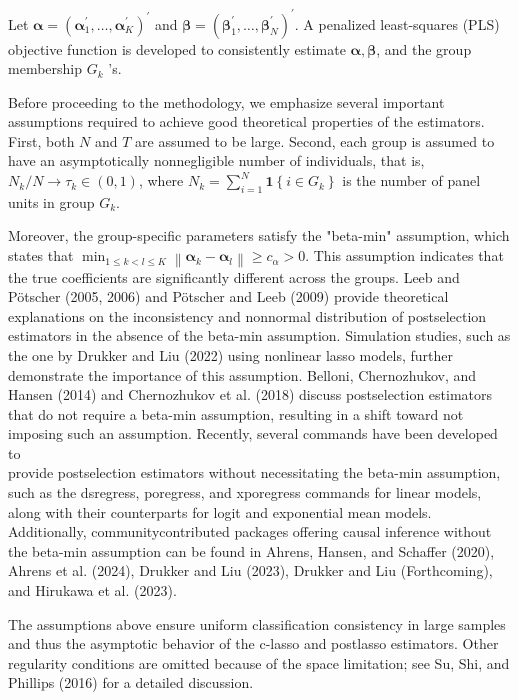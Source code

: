 \documentclass[10pt]{article}
\begin{document}
Let $\boldsymbol{\alpha}=\left(\boldsymbol{\alpha}_{1}^{\prime}, \ldots, \boldsymbol{\alpha}_{K}^{\prime}\right)^{\prime}$ and $\boldsymbol{\beta}=\left(\boldsymbol{\beta}_{1}^{\prime}, \ldots, \boldsymbol{\beta}_{N}^{\prime}\right)^{\prime}$. A penalized least-squares (PLS) objective function is developed to consistently estimate $\boldsymbol{\alpha}, \boldsymbol{\beta}$, and the group membership $G_{k}$ 's.

Before proceeding to the methodology, we emphasize several important assumptions required to achieve good theoretical properties of the estimators. First, both $N$ and $T$ are assumed to be large. Second, each group is assumed to have an asymptotically nonnegligible number of individuals, that is, $N_{k} / N \rightarrow \tau_{k} \in(0,1)$, where $N_{k}=\sum_{i=1}^{N} \mathbf{1}\left\{i \in G_{k}\right\}$ is the number of panel units in group $G_{k}$.

Moreover, the group-specific parameters satisfy the "beta-min" assumption, which states that $\min _{1 \leq k<l \leq K}\left\|\boldsymbol{\alpha}_{k}-\boldsymbol{\alpha}_{l}\right\| \geq c_{\alpha}>0$. This assumption indicates that the true coefficients are significantly different across the groups. Leeb and Pötscher (2005, 2006) and Pötscher and Leeb (2009) provide theoretical explanations on the inconsistency and nonnormal distribution of postselection estimators in the absence of the beta-min assumption. Simulation studies, such as the one by Drukker and Liu (2022) using nonlinear lasso models, further demonstrate the importance of this assumption. Belloni, Chernozhukov, and Hansen (2014) and Chernozhukov et al. (2018) discuss postselection estimators that do not require a beta-min assumption, resulting in a shift toward not imposing such an assumption. Recently, several commands have been developed to\\
provide postselection estimators without necessitating the beta-min assumption, such as the dsregress, poregress, and xporegress commands for linear models, along with their counterparts for logit and exponential mean models. Additionally, communitycontributed packages offering causal inference without the beta-min assumption can be found in Ahrens, Hansen, and Schaffer (2020), Ahrens et al. (2024), Drukker and Liu (2023), Drukker and Liu (Forthcoming), and Hirukawa et al. (2023).

The assumptions above ensure uniform classification consistency in large samples and thus the asymptotic behavior of the c-lasso and postlasso estimators. Other regularity conditions are omitted because of the space limitation; see Su, Shi, and Phillips (2016) for a detailed discussion.
\end{document}
